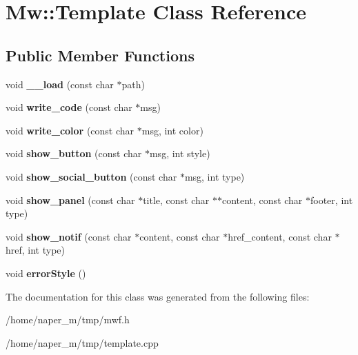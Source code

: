 \hypertarget{class_mw_1_1_template}{\section{Mw\-:\-:Template Class Reference}
\label{class_mw_1_1_template}
}
\subsection*{Public Member Functions}
\begin{DoxyCompactItemize}
\item 
\hypertarget{class_mw_1_1_template_a173db264d1f5be1e4ca2cedbacdcb3c7}{void {\bfseries \-\_\-\-\_\-load} (const char $\ast$path)}\label{class_mw_1_1_template_a173db264d1f5be1e4ca2cedbacdcb3c7}

\item 
\hypertarget{class_mw_1_1_template_aba3f9053ff706f646f3d04326fedd5d2}{void {\bfseries write\-\_\-code} (const char $\ast$msg)}\label{class_mw_1_1_template_aba3f9053ff706f646f3d04326fedd5d2}

\item 
\hypertarget{class_mw_1_1_template_ae0e7811379d7143845e7286943d15027}{void {\bfseries write\-\_\-color} (const char $\ast$msg, int color)}\label{class_mw_1_1_template_ae0e7811379d7143845e7286943d15027}

\item 
\hypertarget{class_mw_1_1_template_addfd03c0cb772b8248b742704ff5b422}{void {\bfseries show\-\_\-button} (const char $\ast$msg, int style)}\label{class_mw_1_1_template_addfd03c0cb772b8248b742704ff5b422}

\item 
\hypertarget{class_mw_1_1_template_acaba24d30b717f91cceb757ca56c7475}{void {\bfseries show\-\_\-social\-\_\-button} (const char $\ast$msg, int type)}\label{class_mw_1_1_template_acaba24d30b717f91cceb757ca56c7475}

\item 
\hypertarget{class_mw_1_1_template_ad40868a5e6ac9c0179faa99199c99c7b}{void {\bfseries show\-\_\-panel} (const char $\ast$title, const char $\ast$$\ast$content, const char $\ast$footer, int type)}\label{class_mw_1_1_template_ad40868a5e6ac9c0179faa99199c99c7b}

\item 
\hypertarget{class_mw_1_1_template_ab47decaed3150a55783fe1e4af5ff695}{void {\bfseries show\-\_\-notif} (const char $\ast$content, const char $\ast$href\-\_\-content, const char $\ast$href, int type)}\label{class_mw_1_1_template_ab47decaed3150a55783fe1e4af5ff695}

\item 
\hypertarget{class_mw_1_1_template_a3afcf171f1b277a8a8d2974bf165fb3e}{void {\bfseries error\-Style} ()}\label{class_mw_1_1_template_a3afcf171f1b277a8a8d2974bf165fb3e}

\end{DoxyCompactItemize}


The documentation for this class was generated from the following files\-:\begin{DoxyCompactItemize}
\item 
/home/naper\-\_\-m/tmp/mwf.\-h\item 
/home/naper\-\_\-m/tmp/template.\-cpp\end{DoxyCompactItemize}
